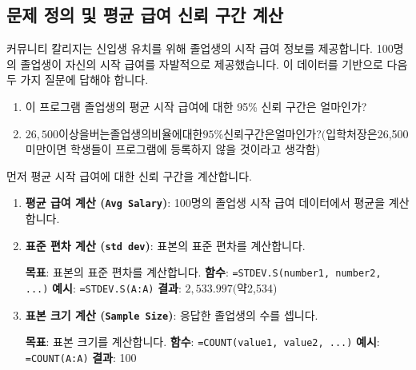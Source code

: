 \documentclass[11pt,a4paper]{book}
\newcommand{\excel}[1]{\texttt{#1}}
\theoremstyle{definition}
\begin{document}
\begin{enumerate}
\begin{enumerate}
\subsection{문제 정의 및 평균 급여 신뢰 구간 계산}
커뮤니티 칼리지는 신입생 유치를 위해 졸업생의 시작 급여 정보를 제공합니다. 100명의 졸업생이 자신의 시작 급여를 자발적으로 제공했습니다. 이 데이터를 기반으로 다음 두 가지 질문에 답해야 합니다.
\begin{enumerate}
    \item 이 프로그램 졸업생의 평균 시작 급여에 대한 95\% 신뢰 구간은 얼마인가?
    \item $26,500 이상을 버는 졸업생의 비율에 대한 95\% 신뢰 구간은 얼마인가? (입학처장은 $26,500 미만이면 학생들이 프로그램에 등록하지 않을 것이라고 생각함)
\end{enumerate}

먼저 평균 시작 급여에 대한 신뢰 구간을 계산합니다.

\begin{enumerate}
    \item \textbf{평균 급여 계산 (\excel{Avg Salary})}:
    100명의 졸업생 시작 급여 데이터에서 평균을 계산합니다.

    \item \textbf{표준 편차 계산 (\excel{std dev})}:
    표본의 표준 편차를 계산합니다.
    \begin{examplebox}[title=Excel STDEV.S 함수 사용법]
        \textbf{목표}: 표본의 표준 편차를 계산합니다.
        \textbf{함수}: \texttt{=STDEV.S(number1, number2, ...)}
        \textbf{예시}: \texttt{=STDEV.S(A:A)}
        \textbf{결과}: $2,533.997 (약 $2,534)
    \end{examplebox}

    \item \textbf{표본 크기 계산 (\excel{Sample Size})}:
    응답한 졸업생의 수를 셉니다.
    \begin{examplebox}[title=Excel COUNT 함수 사용법]
        \textbf{목표}: 표본 크기를 계산합니다.
        \textbf{함수}: \texttt{=COUNT(value1, value2, ...)}
        \textbf{예시}: \texttt{=COUNT(A:A)}
        \textbf{결과}: 100
    \end{examplebox}


\end{enumerate}
\end{enumerate}
\end{enumerate}
\end{document}
